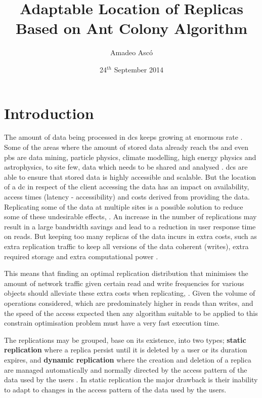 \documentclass[english]{article}
\begin{document}
\title{Adaptable Location of Replicas Based on Ant Colony Algorithm}

\author{Amadeo Asc\'{o}}

\date{24$^{th}$ September 2014}

\maketitle



\section{Introduction}
	The amount of data being processed in \glspl{dc} keeps growing at enormous rate \cite{Tolle2011a, Cisco2014a, Chanthadavong2014a}. Some of the areas where the amount of stored data already reach \glspl{tb} and even \glspl{pb} are data mining, particle physics, climate modelling, high energy physics and astrophysics, to site few, data which needs to be shared and analysed \cite{KingsyGrace2013a, MohdZin2012a, Naseera2009a}. \glspl{dc} are able to ensure that stored data is highly accessible and scalable. But the location of a \gls{dc} in respect of the client accessing the data has an impact on availability, access times (latency - accessibility) and costs derived from providing the data. Replicating some of the data at multiple sites is a possible solution to reduce some of these undesirable effects, \cite{Briquemont2014a, Abad2011a, Venugopal2006a}. An increase in the number of replications may result in a large bandwidth savings and lead to a reduction in user response time on reads. But keeping too many replicas of the data incurs in extra costs, such as extra replication traffic to keep all versions of the data coherent (writes), extra required storage and extra computational power \cite{Goel2006a}.
	
	This means that finding an optimal replication distribution that minimises the amount of network traffic given certain read and write frequencies for various objects should alleviate these extra costs when replicating, \cite{Wolfson1990a, Briquemont2014a}. Given the volume of operations considered, which are predominately higher in reads than writes, and the speed of the access expected then any algorithm suitable to be applied to this constrain optimisation problem must have a very fast execution time.

	The replications may be grouped, base on its existence, into two types; {\bf static replication} where a replica persist until it is deleted by a user or its duration expires, and {\bf dynamic replication} where the creation and deletion of a replica are managed automatically and normally directed by the access pattern of the data used by the users \cite{Dong2008a}. In static replication the major drawback is their inability to adapt to changes in the access pattern of the data used by the users.
	
\end{document}
